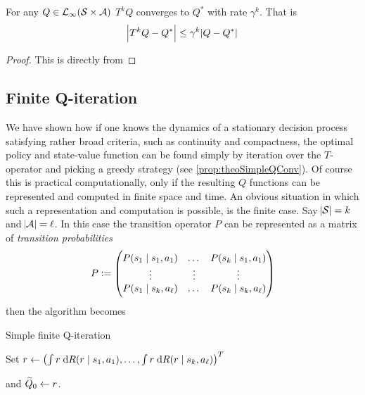 \begin{cor}
  For any $Q \in \mathcal{L}_\infty(\mathcal{S} \times \mathcal{A})$
  $T^k Q$ converges to $Q^*$ with rate $\gamma^k$.
  That is
  \[ \abs{T^k Q - Q^*} \leq \gamma^k \abs{Q - Q^*} \]
  \label{cor:QrateSimple}
\end{cor}
\begin{proof}
  This is directly from %
\end{proof}

\subsection{Finite Q-iteration}
We have shown how if one knows the dynamics
of a stationary decision process satisfying rather broad criteria, 
such as continuity and compactness,
the optimal policy and state-value function can be found
simply by iteration over the $T$-operator and picking a greedy strategy
(see \cref{prop:theoSimpleQConv}).
Of course this is practical computationally, only if
the resulting $Q$ functions can be represented and computed in finite
space and time.
An obvious situation in which such a representation and computation is possible,
is the finite case.
Say $\abs{\mathcal{S}} = k$ and $\abs{\mathcal{A}} = \ell$.
In this case the transition operator $P$ can be represented as a
matrix of \emph{transition probabilities}
\[ P \vcentcolon= \begin{pmatrix}
    P(s_1 \mid s_1, a_1) & \dots & P(s_k \mid s_1, a_1)
    \\ \vdots & \vdots & \vdots
    \\ P(s_1 \mid s_k, a_\ell) & \dots & P(s_k \mid s_k, a_\ell)
\end{pmatrix} \]
then the algorithm becomes

\begin{algorithm}[H] %
\caption{Simple finite Q-iteration}
Set $ r \leftarrow \left(\int r \; \mathrm{d} R(r \mid s_1, a_1),
\dots, \int r \; \mathrm{d} R(r \mid s_k, a_\ell) \right)^T $

and $ \widetilde{Q}_0 \leftarrow r$.

\label{alg:finiteSimpleQ}
\end{algorithm}

